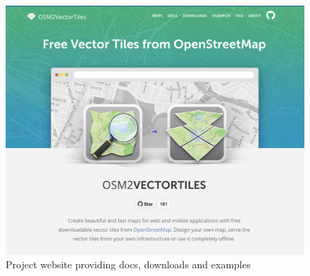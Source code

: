 \begin{figure}[H]
\centering
\includegraphics[width=\textwidth]{images/project_website}
\caption*{Project website \osmvt{} providing docs, downloads and examples}
\end{figure}

\endgroup

\vfill
